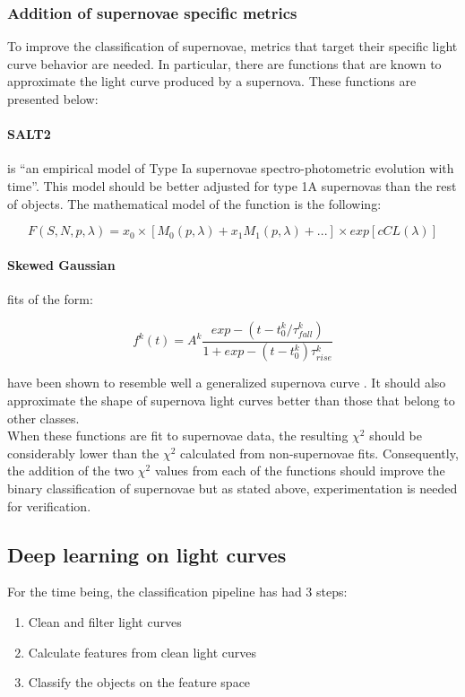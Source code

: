 \subsubsection{Addition of supernovae specific metrics}

To improve the classification of supernovae, metrics that target their specific light curve behavior are needed. In particular, there are functions that are known to approximate the light curve produced by a supernova. These functions are presented below: 

\paragraph{SALT2} is ``an empirical model of Type Ia supernovae spectro-photometric evolution with time''\cite{salt2}. This model should be better adjusted for type 1A supernovas than the rest of objects. The mathematical model of the function is the following\cite{salt2}:

\[
  F(S,N,p,\lambda) = x_0 \times [M_0(p,\lambda)+x_1M_1(p,\lambda)+...]\times exp[cCL(\lambda)]
\]

\paragraph{Skewed Gaussian} fits of the form:

\[f^k(t) = A^k \frac{exp-(t-t_0^k/\tau^k_{fall})}{1+exp-(t-t^k_0)\tau^k_{rise}}\]

have been shown to resemble well a generalized supernova curve \cite{sGaussian}. It should also approximate the shape of supernova light curves better than those that belong to other classes.\\

When these functions are fit to supernovae data, the resulting $\chi^2$ should be considerably lower than the $\chi^2$ calculated from non-supernovae fits. Consequently, the addition of the two $\chi^2$  values from each of the functions should improve the binary classification of supernovae but as stated above, experimentation is needed for verification.

\subsection{Deep learning on light curves}

For the time being, the classification pipeline has had 3 steps:

\begin{enumerate}
  \item Clean and filter light curves
  \item Calculate features from clean light curves
  \item Classify the objects on the feature space
\end{enumerate}

